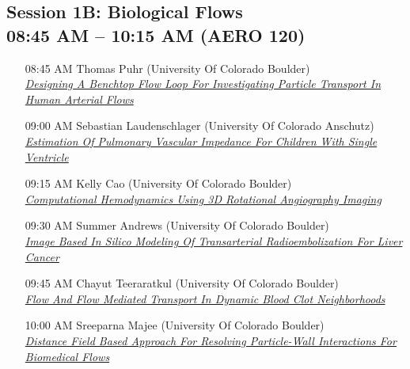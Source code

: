 \subsection*{Session 1B: Biological Flows \\ 08:45 AM  -- 10:15 AM (AERO 120)}
\begin{enumerate}
\item [08:45 AM] Thomas Puhr (University Of Colorado Boulder) \\ \hyperlink{ThomasPuhr}{\it Designing A Benchtop Flow Loop For Investigating Particle Transport In Human Arterial Flows }
\item [09:00 AM] Sebastian Laudenschlager (University Of Colorado Anschutz) \\ \hyperlink{SebastianLaudenschlager}{\it Estimation Of Pulmonary Vascular Impedance For Children With Single Ventricle }
\item [09:15 AM] Kelly Cao (University Of Colorado Boulder) \\ \hyperlink{KellyCao}{\it Computational Hemodynamics Using 3D Rotational Angiography Imaging  }
\item [09:30 AM] Summer Andrews (University Of Colorado Boulder) \\ \hyperlink{SummerAndrews}{\it Image Based In Silico Modeling Of Transarterial Radioembolization For Liver Cancer }
\item [09:45 AM] Chayut Teeraratkul (University Of Colorado Boulder) \\ \hyperlink{ChayutTeeraratkul}{\it Flow And Flow Mediated Transport In Dynamic Blood Clot Neighborhoods }
\item [10:00 AM] Sreeparna Majee (University Of Colorado Boulder) \\ \hyperlink{SreeparnaMajee}{\it Distance Field Based Approach For Resolving Particle-Wall Interactions For Biomedical Flows }
\end{enumerate}
